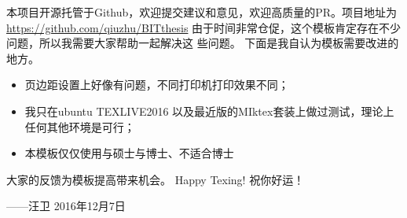 \begin{summary}
本项目开源托管于Github，欢迎提交建议和意见，欢迎高质量的PR。项目地址为\url{https://github.com/qiuzhu/BITthesis}
由于时间非常仓促，这个模板肯定存在不少问题，所以我需要大家帮助一起解决这
些问题。
下面是我自认为模板需要改进的地方。
\begin{itemize}
	\item 页边距设置上好像有问题，不同打印机打印效果不同；
	\item 我只在ubuntu TEXLIVE2016 以及最近版的MIktex套装上做过测试，理论上任何其他环境是可行；
	\item 本模板仅仅使用与硕士与博士、不适合博士
\end{itemize}

大家的反馈为模板提高带来机会。
Happy Texing!
祝你好运！

\bigskip
\hfill ——汪卫 2016年12月7日

\end{summary}

